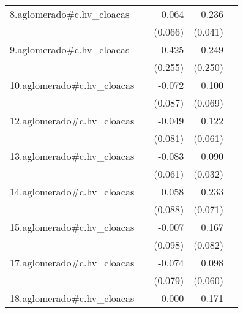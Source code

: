 {\begin{longtable}{l*{4}{D{.}{.}{-1}}}
\addlinespace
8.aglomerado#c.hv\_cloacas&                     &       0.064         &       0.236\sym{***}&                     \\
            &                     &     (0.066)         &     (0.041)         &                     \\
\addlinespace
9.aglomerado#c.hv\_cloacas&                     &      -0.425         &      -0.249         &                     \\
            &                     &     (0.255)         &     (0.250)         &                     \\
\addlinespace
10.aglomerado#c.hv\_cloacas&                     &      -0.072         &       0.100         &                     \\
            &                     &     (0.087)         &     (0.069)         &                     \\
\addlinespace
12.aglomerado#c.hv\_cloacas&                     &      -0.049         &       0.122\sym{*}  &                     \\
            &                     &     (0.081)         &     (0.061)         &                     \\
\addlinespace
13.aglomerado#c.hv\_cloacas&                     &      -0.083         &       0.090\sym{**} &                     \\
            &                     &     (0.061)         &     (0.032)         &                     \\
\addlinespace
14.aglomerado#c.hv\_cloacas&                     &       0.058         &       0.233\sym{**} &                     \\
            &                     &     (0.088)         &     (0.071)         &                     \\
\addlinespace
15.aglomerado#c.hv\_cloacas&                     &      -0.007         &       0.167\sym{*}  &                     \\
            &                     &     (0.098)         &     (0.082)         &                     \\
\addlinespace
17.aglomerado#c.hv\_cloacas&                     &      -0.074         &       0.098         &                     \\
            &                     &     (0.079)         &     (0.060)         &                     \\
\addlinespace
18.aglomerado#c.hv\_cloacas&                     &       0.000         &       0.171\sym{***}&                     \\

\end{longtable}}
